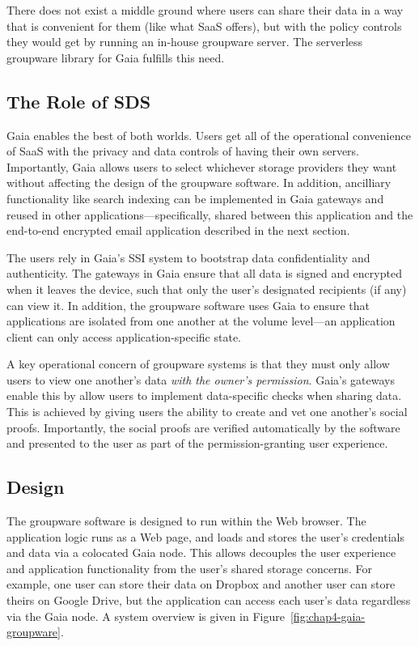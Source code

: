 There does not exist a middle ground where users can share their data in a way
that is convenient for them (like what SaaS offers), but with the policy
controls they would get by running an in-house groupware server.  The serverless
groupware library for Gaia fulfills this need.

\subsection{The Role of SDS}

Gaia enables the best of both worlds.  Users get all of the
operational convenience of SaaS with the privacy and data controls of having
their own servers.  Importantly, Gaia allows users to select whichever storage
providers they want without affecting the design of the groupware software. 
In addition, ancilliary functionality like search indexing can be
implemented in Gaia gateways and reused in other applications---specifically,
shared between this application and the end-to-end encrypted email application
described in the next section.

The users rely in Gaia's SSI system to bootstrap data confidentiality and
authenticity.  The gateways in Gaia ensure that all data is signed and encrypted
when it leaves the device, such that only the user's designated recipients (if
any) can view it.  In addition, the groupware software uses Gaia to ensure that
applications are isolated from one another at the volume level---an application
client can only access application-specific state.

A key operational concern of groupware systems is that they must only allow
users to view one another's data \emph{with the owner's permission}.  Gaia's
gateways enable this by allow users to implement data-specific checks when sharing
data.  This is achieved by giving users the ability to create and vet one
another's social proofs.  Importantly, the social proofs are verified
automatically by the software and presented to the user as part of the
permission-granting user experience.

\subsection{Design}

The groupware software is designed to run within the Web browser.  The
application logic runs as a Web page, and loads and stores the user's
credentials and data via a colocated Gaia node.  This allows decouples the
user experience and application functionality from the user's shared
storage concerns.  For example, one user can store their data on Dropbox and
another user can store theirs on Google Drive, but the application can access
each user's data regardless via the Gaia node.  A system overview is given
in Figure~\ref{fig:chap4-gaia-groupware}.

